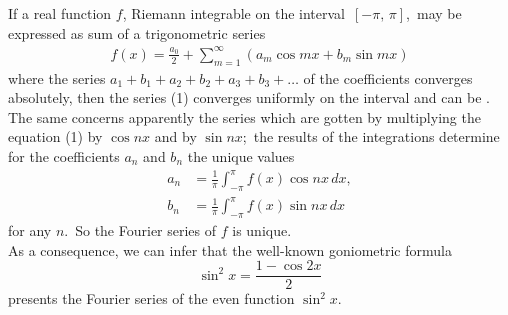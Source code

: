 \documentclass[12pt]{article}
\theoremstyle{definition}
\begin{document}
If a real function $f$, Riemann integrable on the interval\, $[-\pi,\,\pi]$,\, may be expressed as sum of a trigonometric series
\begin{align}
f(x) = \frac{a_0}{2}\!+\!\sum_{m=1}^\infty(a_m\cos{mx}+b_m\sin{mx})
\end{align}
where the series $a_1\!+\!b_1\!+\!a_2\!+\!b_2\!+\!a_3\!+\!b_3\!+\ldots$ of the coefficients converges absolutely, then the series (1) converges uniformly on the interval and can be .\, The same concerns apparently the series which are gotten by multiplying the equation (1) by $\cos{nx}$ and by $\sin{nx}$;\, the results of the integrations determine for the coefficients $a_n$ and $b_n$ the unique values
\begin{align*}
a_n &= \frac{1}{\pi}\!\int_{-\pi}^{\pi} f(x)\cos{nx}\,dx,\\
b_n &= \frac{1}{\pi}\!\int_{-\pi}^{\pi} f(x)\sin{nx}\,dx
\end{align*}
for any $n$.\, So the Fourier series of $f$ is unique.\\

As a consequence, we can infer that the well-known goniometric formula
$$\sin^2{x} = \frac{1-\cos{2x}}{2}$$
presents the Fourier series  of the even function $\sin^2{x}$.

\end{document}
